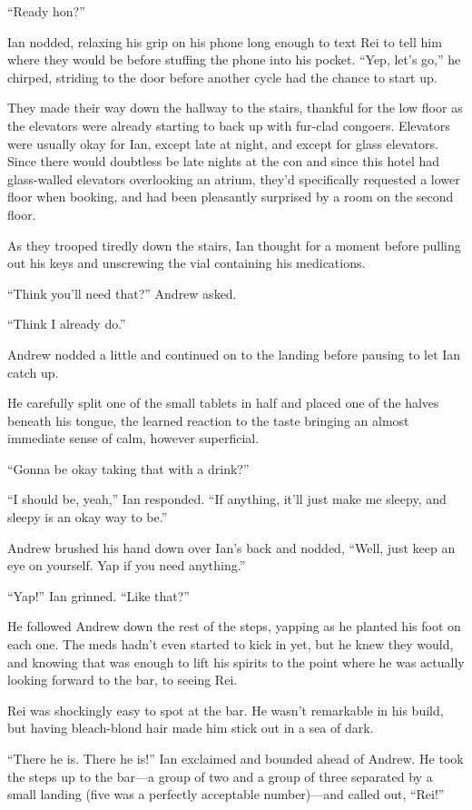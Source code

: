 ``Ready hon?''

Ian nodded, relaxing his grip on his phone long enough to text Rei to tell him where they would be before stuffing the phone into his pocket. ``Yep, let's go,'' he chirped, striding to the door before another cycle had the chance to start up.

They made their way down the hallway to the stairs, thankful for the low floor as the elevators were already starting to back up with fur-clad congoers. Elevators were usually okay for Ian, except late at night, and except for glass elevators. Since there would doubtless be late nights at the con and since this hotel had glass-walled elevators overlooking an atrium, they'd specifically requested a lower floor when booking, and had been pleasantly surprised by a room on the second floor.

As they trooped tiredly down the stairs, Ian thought for a moment before pulling out his keys and unscrewing the vial containing his medications.

``Think you'll need that?'' Andrew asked.

``Think I already do.''

Andrew nodded a little and continued on to the landing before pausing to let Ian catch up.

He carefully split one of the small tablets in half and placed one of the halves beneath his tongue, the learned reaction to the taste bringing an almost immediate sense of calm, however superficial.

``Gonna be okay taking that with a drink?''

``I should be, yeah,'' Ian responded. ``If anything, it'll just make me sleepy, and sleepy is an okay way to be.''

Andrew brushed his hand down over Ian's back and nodded, ``Well, just keep an eye on yourself. Yap if you need anything.''

``Yap!'' Ian grinned. ``Like that?''

He followed Andrew down the rest of the steps, yapping as he planted his foot on each one. The meds hadn't even started to kick in yet, but he knew they would, and knowing that was enough to lift his spirits to the point where he was actually looking forward to the bar, to seeing Rei.

Rei was shockingly easy to spot at the bar. He wasn't remarkable in his build, but having bleach-blond hair made him stick out in a sea of dark.

``There he is. There he is!'' Ian exclaimed and bounded ahead of Andrew. He took the steps up to the bar---a group of two and a group of three separated by a small landing (five was a perfectly acceptable number)---and called out, ``Rei!''


